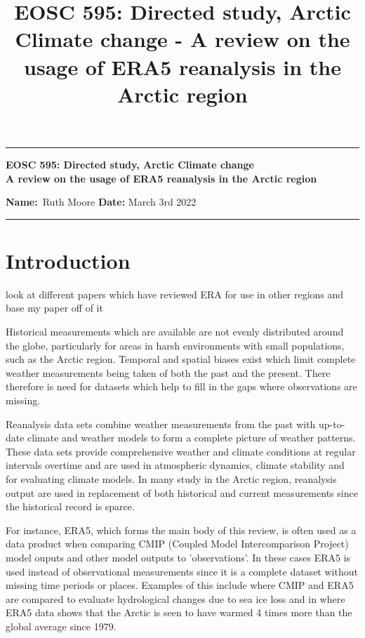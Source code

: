 \documentclass[11pt, oneside]{article}
\title{EOSC 595: Directed study, Arctic Climate change - A review on the usage of ERA5 reanalysis in the Arctic region  }
\begin{document}
\begin{center}
	\hrule
	\vspace{.4cm}
	{\textbf { \large EOSC 595: Directed study, Arctic Climate change \\ A review on the usage of ERA5 reanalysis in the Arctic region}}
\end{center}
{\textbf{Name:}\ Ruth Moore \hspace{\fill} }\textbf{Date:} March 3rd 2022   \\
	\hrule


\hfill
\hfill
 \hfill
\hfill

\section{Introduction}

{\color{blue}look at different papers which have reviewed ERA for use in other regions and base my paper off of it}


Historical measurements which are available are not evenly distributed around the globe, particularly for areas in harsh environments with small populations, such as the Arctic region. Temporal and spatial biases exist which limit complete weather measurements being taken of both the past and the present. There therefore is need for datasets which help to fill in the gaps where observations are missing.

Reanalysis data sets combine weather measurements from the past with up-to-date climate and weather models to form a complete picture of weather patterns. These data sets provide comprehensive weather and climate conditions at regular intervals overtime and are used in atmospheric dynamics, climate stability and for evaluating climate models. In many study in the Arctic region, reanalysis output are used in replacement of both historical and current measurements since the historical record is sparce.

For instance, ERA5, which forms the main body of this review, is often used as a data product when comparing CMIP (Coupled Model Intercomparison Project) model ouputs and other model outputs to 'observations'. In these cases ERA5 is used instead of observational measurements since it is a complete dataset without missing time periods or places. Examples of this include \cite{ford2022arctic} where CMIP and ERA5 are compared to evaluate hydrological changes due to sea ice loss and in \cite{rantanen2022arctic} where ERA5 data shows that the Arctic is seen to have warmed 4 times more than the global average since 1979. 
\end{document}
